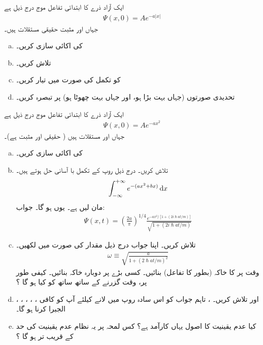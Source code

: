 ایک آزاد ذرے کا ابتدائی تفاعل موج درج ذیل ہے 
\begin{align*}
\Psi (x,0) = Ae^{ -a \left| x \right|} 
\end{align*}
جہاں  اور  مثبت حقیقی مستقلات  ہیں۔
\begin{enumerate}[a.]
\item 
{} کی اکائی سازی کریں۔ 
\item
{}  تلاش کریں۔ 
\item
{} کو تکمل کی صورت میں تیار کریں۔ 
\item
تحدیدی صورتوں  (جہاں  بہت بڑا ہو، اور جہاں  بہت چھوٹا ہو)   پر تبصرہ کریں۔ 
\end{enumerate}
 \quad {}
 ایک آزاد ذرے کا ابتدائی تفاعل موج درج ذیل ہے
\begin{align*}
\Psi(x,0) = A e^{-ax^{2}}
\end{align*}
جہاں  اور  مستقلات ہیں ( حقیقی اور مثبت ہے)۔ 
\begin{enumerate}[a.]
\item
{} کی اکائی سازی کریں۔ 
\item
{}  تلاش کریں۔    درج ذیل روپ کے تکمل با آسانی حل ہوتے ہیں۔ 
\begin{align*}
\int_{-\infty}^{+\infty} e^{-(ax^{2} +bx)} \dif x
\end{align*}
مان لیں  ہے۔ یوں  ہو گا۔ جواب: 
\begin{align*}
\Psi(x,t) = \left( \frac{2a}{\pi} \right) ^{1/4} \frac{e^{-ax^{2}/[1+(2i\hslash at/m)]}}{\sqrt{1+(2i\hslash at/m)}}
\end{align*}
\item
{} تلاش کریں۔ اپنا جواب درج ذیل مقدار کی صورت میں لکھیں۔ 
\begin{align*}
\omega \equiv \sqrt{\frac{a}{1+(2\hslash at/m)^{2}}}
\end{align*}
وقت  پر  کا خاکہ (بطور  کا تفاعل)  بنائیں۔ کسی بڑے  پر دوبارہ خاکہ بنائیں۔ کیفی طور پر، وقت گزرنے کے ساتھ ساتھ  کو کیا ہو گا ؟
\item 
{}، ،  ، ،   ،  اور   تلاش کریں۔   ، تاہم جواب کو اس سادہ روپ میں لانے کیلئے آپ کو کافی الجبرا کرنا ہو گا۔ 
\item
کیا عدم یقینیت کا اصول یہاں کارآمد ہے؟ کس لمحہ  پر یہ نظام عدم یقینیت کی حد کے قریب تر ہو گا ؟
\end{enumerate}

